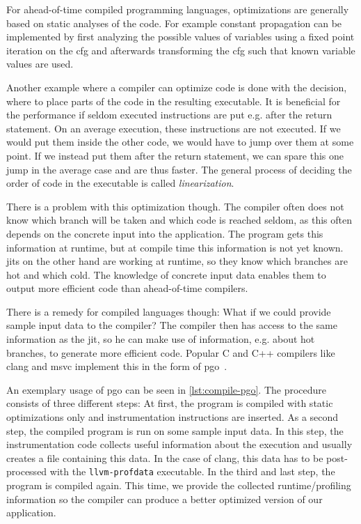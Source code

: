 For ahead-of-time compiled programming languages, optimizations are generally based on static analyses of the code. For example constant propagation can be implemented by first analyzing the possible values of variables using a fixed point iteration on the \gls{cfg} and afterwards transforming the \gls{cfg} such that known variable values are used.~\cite{Seidl2010}

Another example where a compiler can optimize code is done with the decision, where to place parts of the code in the resulting executable. It is beneficial for the performance if seldom executed instructions are put e.g. after the return statement. On an average execution, these instructions are not executed. If we would put them inside the other code, we would have to jump over them at some point. If we instead put them after the return statement, we can spare this one jump in the average case and are thus faster. The general process of deciding the order of code in the executable is called \emph{linearization}.

There is a problem with this optimization though. The compiler often does not know which branch will be taken and which code is reached seldom, as this often depends on the concrete input into the application. The program gets this information at runtime, but at compile time this information is not yet known. \Glspl{jit} on the other hand are working at runtime, so they know which branches are hot and which cold. The knowledge of concrete input data enables them to output more efficient code than ahead-of-time compilers.

There is a remedy for compiled languages though: What if we could provide sample input data to the compiler? The compiler then has access to the same information as the \gls{jit}, so he can make use of information, e.g. about hot branches, to generate more efficient code. Popular C and C++ compilers like clang and msvc implement this in the form of \gls{pgo}~\cite{ClangManual, MicrosoftPgo}.



An exemplary usage of \gls{pgo} can be seen in \cref{lst:compile-pgo}. The procedure consists of three different steps: At first, the program is compiled with static optimizations only and instrumentation instructions are inserted. As a second step, the compiled program is run on some sample input data. In this step, the instrumentation code collects useful information about the execution and usually creates a file containing this data. In the case of clang, this data has to be post-processed with the \texttt{llvm-profdata} executable. In the third and last step, the program is compiled again. This time, we provide the collected runtime/profiling information so the compiler can produce a better optimized version of our application.

